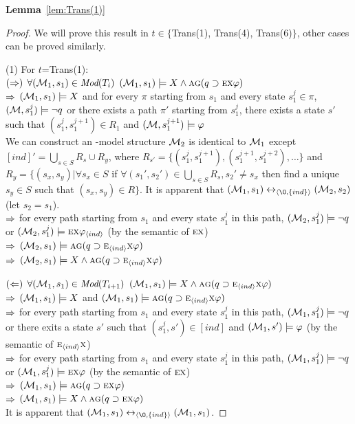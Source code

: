 \documentclass{article}
\begin{document}
\textbf{Lemma}~\ref{lem:Trans(1)}
\begin{proof}
We will prove this result in $t\in \{$Trans(1), Trans(4), Trans(6)$\}$, other cases can be proved similarly.

(1) For $t$=Trans(1):\\
 $(\Rightarrow)$ $\forall ({\cal M}_1,s_1) \in \textit{Mod}(T_i)$ \ie $({\cal M}_1, s_1) \models X \wedge \textsc{a}\textsc{g}(q \supset \textsc{e} \textsc{x} \varphi)$\\
 $\Rightarrow$ $({\cal M}_1,s_1)\models X$ and for every $\pi$ starting from $s_1$ and every state $s_1^j \in \pi$, $({\cal M},s_1^j) \models \neg q$ or there exists a path $\pi'$ starting from $s_1^j$, there exists a state $s'$ such that $(s_1^j,s_1^{j+1})\in R_1$ and $({\cal M},s_1^{j+1})\models \varphi$\\
 We can construct an \Ind-model structure ${\cal M}_2$ is identical to ${\cal M}_1$ except  $[ind]'= \bigcup_{s\in S} R_s \cup R_y$, where $R_{s'}=\{(s_1^{j},s_1^{j+1}), (s_1^{j+1}, s_1^{j+2}),\dots\}$ and $R_y=\{(s_x,s_y)| \forall s_x \in S$ if $\forall (s_1',s_2')\in \bigcup_{s\in S} R_s, s_2'\neq s_x$ then find a unique $s_y\in S$ such that $(s_x,s_y)\in R\}$. It is apparent that $(\Hm_1, s_1) \lrto_{\tuple{{\O}, \{ind\}}} (\Hm_2, s_2)$ (let $s_2=s_1$).\\
 $\Rightarrow$ for every path starting from $s_1$ and every state $s_1^j$ in this path, $({\cal M}_2, s_1^j) \models \neg q$ or $({\cal M}_2, s_1^j)\models \textsc{e} \textsc{x} \varphi_{{\langle{ind}\rangle}}$ \hfill (by the semantic of $\textsc{e} \textsc{x}$)\\
 $\Rightarrow$ $({\cal M}_2, s_1) \models \textsc{a} \textsc{g}(q \supset \textsc{e}_{{\langle{ind}\rangle}} \textsc{x} \varphi )$\\
 $\Rightarrow$ $({\cal M}_2, s_1) \models X \wedge \textsc{a} \textsc{g}(q \supset \textsc{e}_{{\langle{ind}\rangle}} \textsc{x} \varphi )$

 $(\Leftarrow)$ $\forall ({\cal M}_1,s_1) \in \textit{Mod}(T_{i+1})$ \ie $({\cal M}_1,s_1) \models X \wedge \textsc{a} \textsc{g}(q \supset \textsc{e}_{{\langle{ind}\rangle}} \textsc{x} \varphi )$\\
 $\Rightarrow$ $({\cal M}_1,s_1) \models X$ and $({\cal M}_1,s_1) \models \textsc{a} \textsc{g}(q \supset \textsc{e}_{{\langle{ind}\rangle}} \textsc{x} \varphi)$\\
 $\Rightarrow$ for every path starting from $s_1$ and every state $s_1^j$ in this path, $({\cal M}_1, s_1^j) \models \neg q$ or there exits a state $s'$ such that $(s_1^j, s')\in [ind]$ and $({\cal M}_1, s') \models \varphi$ \hfill (by the semantic of $\textsc{e}_{{\langle{ind}\rangle}} \textsc{x}$)\\
 $\Rightarrow$ for every path starting from $s_1$ and every state $s_1^j$ in this path, $({\cal M}_1, s_1^j) \models \neg q$ or $({\cal M}_1, s_1^j) \models \textsc{e} \textsc{x} \varphi$ \hfill (by the semantic of $\textsc{e} \textsc{x}$)\\
 $\Rightarrow$ $({\cal M}_1,s_1) \models \textsc{a}\textsc{g}(q \supset \textsc{e} \textsc{x} \varphi)$\\
 $\Rightarrow$ $({\cal M}_1, s_1) \models X \wedge \textsc{a}\textsc{g}(q \supset \textsc{e} \textsc{x} \varphi)$\\
 It is apparent that $(\Hm_1, s_1) \lrto_{\tuple{{\O}, \{ind\}}} (\Hm_1, s_1)$.


\end{proof}
\end{document}
